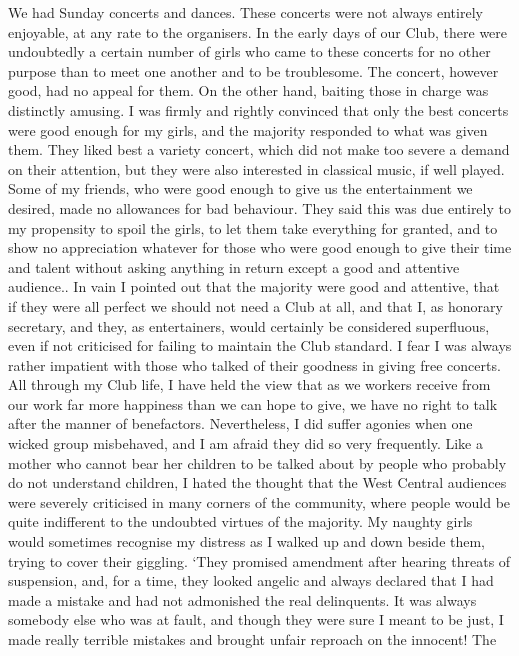 We had Sunday concerts and dances. These concerts
were not always entirely enjoyable, at any rate to the
organisers. In the early days of our Club, there were
undoubtedly a certain number of girls who came to these
concerts for no other purpose than to meet one another
and to be troublesome. The concert, however good, had
no appeal for them. On the other hand, baiting those in
charge was distinctly amusing. I was firmly and rightly
convinced that only the best concerts were good enough
for my girls, and the majority responded to what
was given them. They liked best a variety concert, which
did not make too severe a demand on their attention, but
they were also interested in classical music, if well played.
Some of my friends, who were good enough to give us
the entertainment we desired, made no allowances for
bad behaviour. They said this was due entirely to my
propensity to spoil the girls, to let them take everything
for granted, and to show no appreciation whatever for
those who were good enough to give their time and talent
without asking anything in return except a good and
attentive audience.. In vain I pointed out that the
majority were good and attentive, that if they were all
perfect we should not need a Club at all, and that I, as
honorary secretary, and they, as entertainers, would
certainly be considered superfluous, even if not criticised for
failing to maintain the Club standard. I fear I was
always rather impatient with those who talked of their
goodness in giving free concerts. All through my Club
life, I have held the view that as we workers receive from
our work far more happiness than we can hope to give,
we have no right to talk after the manner of benefactors.
Nevertheless, I did suffer agonies when one wicked group
misbehaved, and I am afraid they did so very frequently.
Like a mother who cannot bear her children to be talked
about by people who probably do not understand
children, I hated the thought that the West Central
audiences were severely criticised in many corners of the
community, where people would be quite indifferent to
the undoubted virtues of the majority. My naughty girls
would sometimes recognise my distress as I walked up
and down beside them, trying to cover their giggling.
‘They promised amendment after hearing threats of
suspension, and, for a time, they looked angelic and
always declared that I had made a mistake and had not
admonished the real delinquents. It was always
somebody else who was at fault, and though they were sure
I meant to be just, I made really terrible mistakes and
brought unfair reproach on the innocent! The
